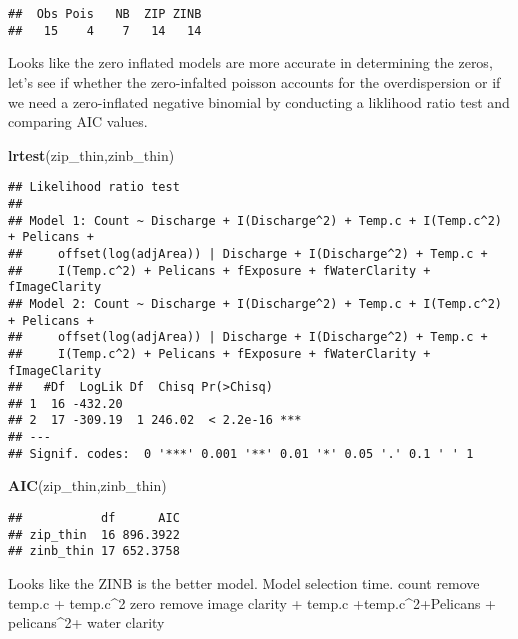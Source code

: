 \documentclass[]{article}
\newenvironment{Shaded}{\begin{snugshade}}{\end{snugshade}}
\newcommand{\KeywordTok}[1]{\textcolor[rgb]{0.13,0.29,0.53}{\textbf{{#1}}}}
\newcommand{\NormalTok}[1]{{#1}}
\begin{document}
\begin{verbatim}
##  Obs Pois   NB  ZIP ZINB 
##   15    4    7   14   14
\end{verbatim}

Looks like the zero inflated models are more accurate in determining the
zeros, let's see if whether the zero-infalted poisson accounts for the
overdispersion or if we need a zero-inflated negative binomial by
conducting a liklihood ratio test and comparing AIC values.

\begin{Shaded}
\begin{Highlighting}[]
\KeywordTok{lrtest}\NormalTok{(zip_thin,zinb_thin)}
\end{Highlighting}
\end{Shaded}

\begin{verbatim}
## Likelihood ratio test
## 
## Model 1: Count ~ Discharge + I(Discharge^2) + Temp.c + I(Temp.c^2) + Pelicans + 
##     offset(log(adjArea)) | Discharge + I(Discharge^2) + Temp.c + 
##     I(Temp.c^2) + Pelicans + fExposure + fWaterClarity + fImageClarity
## Model 2: Count ~ Discharge + I(Discharge^2) + Temp.c + I(Temp.c^2) + Pelicans + 
##     offset(log(adjArea)) | Discharge + I(Discharge^2) + Temp.c + 
##     I(Temp.c^2) + Pelicans + fExposure + fWaterClarity + fImageClarity
##   #Df  LogLik Df  Chisq Pr(>Chisq)    
## 1  16 -432.20                         
## 2  17 -309.19  1 246.02  < 2.2e-16 ***
## ---
## Signif. codes:  0 '***' 0.001 '**' 0.01 '*' 0.05 '.' 0.1 ' ' 1
\end{verbatim}

\begin{Shaded}
\begin{Highlighting}[]
\KeywordTok{AIC}\NormalTok{(zip_thin,zinb_thin)}
\end{Highlighting}
\end{Shaded}

\begin{verbatim}
##           df      AIC
## zip_thin  16 896.3922
## zinb_thin 17 652.3758
\end{verbatim}

Looks like the ZINB is the better model. Model selection time. count
remove temp.c + temp.c\^{}2\textbar{} zero remove image clarity + temp.c
+temp.c\^{}2+Pelicans + pelicans\^{}2+ water clarity
\end{document}
